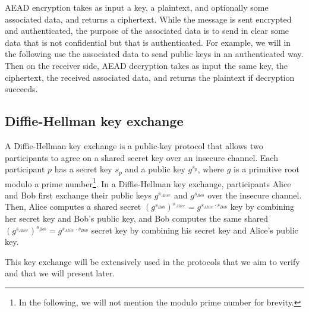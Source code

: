 AEAD encryption takes as input a key, a plaintext, and optionally some associated data, and returns a ciphertext.
While the message is sent encrypted and authenticated, the purpose of the associated data is to send in clear some data that is not confidential but that is authenticated.
For example, we will in the following use the associated data to send public keys in an authenticated way.
Then on the receiver side, AEAD decryption takes as input the same key, the ciphertext, the received associated data, and returns the plaintext if decryption succeeds.

\subsection{Diffie-Hellman key exchange}

A Diffie-Hellman key exchange is a public-key protocol that allows two participants to agree on a shared secret key over an insecure channel.
Each participant $p$ has a secret key $s_p$ and a public key $g^{s_p}$, where $g$ is a primitive root modulo a prime number\footnote{
    In the following, we will not mention the modulo prime number for brevity.
}.
In a Diffie-Hellman key exchange, participants Alice and Bob first exchange their public keys $g^{s_{Alice}}$ and $g^{s_{Bob}}$ over the insecure channel.
Then, Alice computes a shared secret $(g^{s_{Bob}})^{s_{Alice}} = g^{s_{Alice} \cdot s_{Bob}}$ key by combining her secret key and Bob's public key, and Bob computes the same shared $(g^{s_{Alice}})^{s_{Bob}} = g^{s_{Alice} \cdot s_{Bob}}$ secret key by combining his secret key and Alice's public key.

This key exchange will be extensively used in the protocols that we aim to verify and that we will present later.